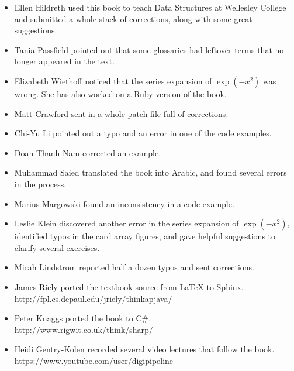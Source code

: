 \begin{itemize}

\item Ellen Hildreth used this book to teach Data Structures at Wellesley College and submitted a whole stack of corrections, along with some great suggestions.

\item Tania Passfield pointed out that some glossaries had leftover terms that no longer appeared in the text.

\item Elizabeth Wiethoff noticed that the series expansion of $\exp(-x^2)$ was wrong.
She has also worked on a Ruby version of the book.

\item Matt Crawford sent in a whole patch file full of corrections.

\item Chi-Yu Li pointed out a typo and an error in one of the code examples.

\item Doan Thanh Nam corrected an example.

\item Muhammad Saied translated the book into Arabic, and found several errors in the process.

\item Marius Margowski found an inconsistency in a code example.

\item Leslie Klein discovered another error in the series expansion of $\exp(-x^2)$, identified typos in the card array figures, and gave helpful suggestions to clarify several exercises.

\item Micah Lindstrom reported half a dozen typos and sent corrections.

\item James Riely ported the textbook source from LaTeX to Sphinx.
\\ \url{http://fpl.cs.depaul.edu/jriely/thinkapjava/}

\item Peter Knaggs ported the book to C\#.
\\ \url{http://www.rigwit.co.uk/think/sharp/}

\item Heidi Gentry-Kolen recorded several video lectures that follow the book.
\\ \url{https://www.youtube.com/user/digipipeline}


\end{itemize}

